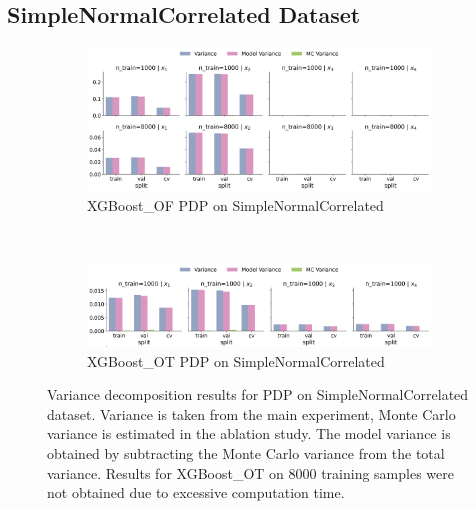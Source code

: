 \documentclass[runningheads]{llncs}
\begin{document}
\subsection{SimpleNormalCorrelated Dataset}
\begin{figure}[htbp]
    \centering
    \begin{subfigure}[b]{0.75\textwidth}
        \includegraphics[width=\textwidth]{img/SNC-all/variance_decomposition_pdp_XGBoost_OF.png}
        \caption{XGBoost\_OF PDP on SimpleNormalCorrelated}
    \end{subfigure}
    \\[10pt]
    \vfill
    \begin{subfigure}[b]{0.75\textwidth}
        \includegraphics[width=\textwidth]{img/SNC-all/variance_decomposition_pdp_XGBoost_OT.png}
        \caption{XGBoost\_OT PDP on SimpleNormalCorrelated}
    \end{subfigure}
    \caption{Variance decomposition results for PDP on SimpleNormalCorrelated dataset. Variance is taken from the
    main experiment, Monte Carlo variance is estimated in the ablation study. The model variance is
    obtained by subtracting the Monte Carlo variance from the total variance. Results for XGBoost\_OT
    on 8000 training samples were not obtained due to excessive computation time.}
    \label{fig:pdp-variance-decomp-snc}  %
\end{figure}
\end{document}
